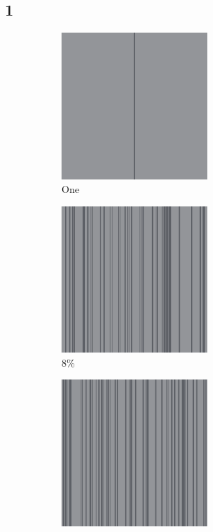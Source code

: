 \documentclass[12pt, fleqn]{report}                             %
\theoremstyle{break}                                            %
\begin{document}
      \subsection{1}
      \begin{figure}[ht!]
        \centering
        \begin{subfigure}[b]{0.4\linewidth}
          \includegraphics[width=0.6\textwidth]{Images/1/a.png}
          \caption{One}
        \end{subfigure}
        \begin{subfigure}[b]{0.4\linewidth}
          \includegraphics[width=0.6\textwidth]{Images/1/b.png}
          \caption{8\%}
        \end{subfigure}
        \begin{subfigure}[b]{0.4\linewidth}
          \includegraphics[width=0.6\textwidth]{Images/1/c.png}

\end{subfigure}
\end{figure}
\end{document}
